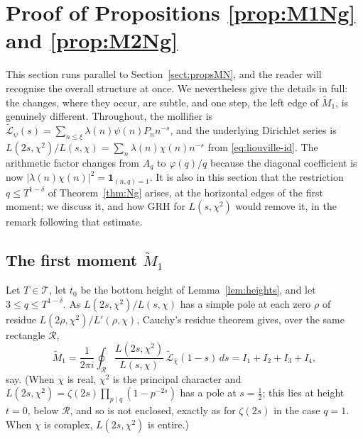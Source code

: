 \documentclass[10pt,a4paper]{amsart}
\numberwithin{equation}{section}
\begin{document}
\section{Proof of Propositions \ref{prop:M1Ng} and \ref{prop:M2Ng}}\label{sect:propsNg}

This section runs parallel to Section~\ref{sect:propsMN}, and the reader will recognise the overall structure at once. We nevertheless give the details in full: the changes, where they occur, are subtle, and one step, the left edge of $\widetilde M_1$, is genuinely different. Throughout, the mollifier is $\widetilde{\mathcal{L}}_\psi(s)=\sum_{n\le\xi}\lambda(n)\psi(n)P_n n^{-s}$, and the underlying Dirichlet series is $L(2s,\chi^2)/L(s,\chi)=\sum_n\lambda(n)\chi(n)n^{-s}$ from \eqref{eq:liouville-id}. The arithmetic factor changes from $A_q$ to $\varphi(q)/q$ because the diagonal coefficient is now $|\lambda(n)\chi(n)|^2=\mathbf 1_{(n,q)=1}$. It is also in this section that the restriction $q\le T^{1-\delta}$ of Theorem~\ref{thm:Ng} arises, at the horizontal edges of the first moment; we discuss it, and how GRH for $L(s,\chi^2)$ would remove it, in the remark following that estimate.

\subsection{The first moment $\widetilde M_1$}
Let $T\in\mathcal T$, let $t_0$ be the bottom height of Lemma~\ref{lem:heights}, and let $3\le q\le T^{1-\delta}$. As $L(2s,\chi^2)/L(s,\chi)$ has a simple pole at each zero $\rho$ of residue $L(2\rho,\chi^2)/L'(\rho,\chi)$, Cauchy's residue theorem gives, over the same rectangle $\mathcal R$,
\[
\widetilde M_1=\frac{1}{2\pi i}\oint_{\mathcal R}\frac{L(2s,\chi^2)}{L(s,\chi)}\,\widetilde{\mathcal{L}}_{\bar\chi}(1-s)\,ds=I_1+I_2+I_3+I_4 ,
\]
say. (When $\chi$ is real, $\chi^2$ is the principal character and $L(2s,\chi^2)=\zeta(2s)\prod_{p\mid q}(1-p^{-2s})$ has a pole at $s=\tfrac12$; this lies at height $t=0$, below $\mathcal R$, and so is not enclosed, exactly as for $\zeta(2s)$ in the case $q=1$. When $\chi$ is complex, $L(2s,\chi^2)$ is entire.)
\end{document}
